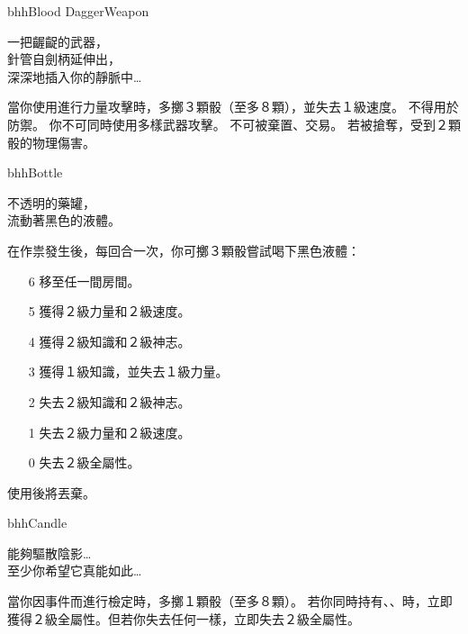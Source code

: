 \linebreak[0]%
\begin{ItemCard}{bhh}{Blood Dagger}{Weapon}
	\begin{CardStory}
		一把齷齪的武器，\\
		針管自劍柄延伸出，\\
		深深地插入你的靜脈中…
	\end{CardStory}
	當你使用\ThisName{}進行力量攻擊時，多擲３顆骰（至多８顆），並失去１級速度。\smallbreak
	\ThisName{}不得用於防禦。\smallbreak
	你不可同時使用多樣武器攻擊。\smallbreak
	\ThisName{}不可被棄置、交易。\smallbreak
	若\ThisName{}被搶奪，受到２顆骰的物理傷害。\smallbreak
\end{ItemCard}%
\linebreak[0]%
\begin{ItemCard}{bhh}{Bottle}{}
	\begin{CardStory}
		不透明的藥罐，\\
		流動著黑色的液體。
	\end{CardStory}
	在作祟發生後，每回合一次，你可擲３顆骰嘗試喝下黑色液體：
	\begin{itemize}
		\item[6] 移至任一間房間。
		\item[5] 獲得２級力量和２級速度。
		\item[4] 獲得２級知識和２級神志。
		\item[3] 獲得１級知識，並失去１級力量。
		\item[2] 失去２級知識和２級神志。
		\item[1] 失去２級力量和２級速度。
		\item[0] 失去２級全屬性。
	\end{itemize}
	使用後將\ThisName{}丟棄。\smallbreak
\end{ItemCard}%
\linebreak[0]%
\begin{ItemCard}{bhh}{Candle}{}
	\begin{CardStory}
		能夠驅散陰影…\\
		至少你希望它真能如此…
	\end{CardStory}
	當你因事件而進行檢定時，多擲１顆骰（至多８顆）。\smallbreak
	若你同時持有、、時，立即獲得２級全屬性。但若你失去任何一樣，立即失去２級全屬性。\smallbreak
\end{ItemCard}%
\linebreak[0]%
